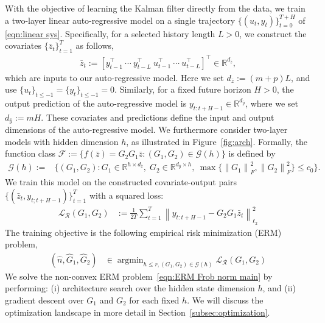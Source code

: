 \documentclass[11pt]{article}
\newcommand{\ybar}{\bar{y}}
\newcommand{\zbar}{\bar{z}}
\newcommand{\Fcal}{\mathcal{F}}
\newcommand{\Gcal}{\mathcal{G}}
\newcommand{\Lcal}{\mathcal{L}}
\newcommand{\Rcal}{\mathcal{R}}
\newcommand{\tn}[1]{\left\|{#1}\right\|_{\ell_2}}
\newcommand{\tf}[1]{\left\|{#1}\right\|_{F}}
\newcommand{\R}{\mathbb{R}}				%
\newcommand{\T}{\top}
\newcommand{\<}{\langle}
\renewcommand{\>}{\rangle}
\numberwithin{equation}{section}
\DeclareMathOperator*{\argmin}{argmin}
\begin{document}
With the objective of learning the Kalman filter directly from the data, we train a two-layer linear auto-regressive model on a single trajectory $\lbrace (u_t, y_t) \rbrace_{t=0}^{T+H}$ of \eqref{eqn:linear sys}. Specifically, for a selected history length $L>0$, we construct the covariates $\{\zbar_t\}_{t=1}^T$ as follows,
\begin{align}
    \zbar_t := [y_{t-1}^\T~\cdots~y_{t-L}^\T~u_{t-1}^\T~\cdots~u_{t-L}^\T]^\T \in \R^{d_{\zbar}}, \label{eqn:zbar_def}
\end{align}
which are inputs to our auto-regressive model. Here we set $d_{\zbar}:=(m+p)L$, and use $\{u_t\}_{t \leq -1} = \{y_t\}_{t \leq -1} = 0$. Similarly, for a fixed future horizon $H>0$, the output prediction of the auto-regressive model is $y_{t:t+H-1} \in \R^{d_{\ybar}}$, where we set $d_{\ybar} := mH$. 
These covariates and predictions define the input and output dimensions of the auto-regressive model. 
We furthermore consider two-layer models with hidden dimension $h$, as illustrated in Figure~\ref{fig:arch}.
Formally, the function class $\Fcal:=\{f(\zbar) = G_2G_1 \zbar : (G_1, G_2) \in \Gcal(h)\}$ is defined by
\begin{equation}
\begin{aligned} \label{eqn:function_class}
    \Gcal(h) := &\big\{(G_1, G_2) \colon G_1 \in \R^{h \times d_{\zbar}}, \; G_2 \in \R^{d_{\ybar} \times h}, ~\max\{\tf{G_1}^2, \tf{G_2}^2\} \leq c_0 \big\}.
\end{aligned}
\end{equation}
We train this model on the constructed covariate-output pairs $\lbrace (\zbar_t, y_{t;t+H-1}) \rbrace_{t=1}^{T}$ with a squared loss:
\begin{align}\label{eqn:loss}
    \Lcal_{\Rcal}(G_1,G_2) &:= \frac{1}{2T}\sum_{t=1}^{T}\tn{y_{t:t+H-1} - G_2 G_1 \zbar_t}^2 
\end{align}
The training objective is the following empirical risk minimization (ERM) problem, 
\begin{equation}
\begin{aligned} \label{eqn:ERM Frob norm main}
    (\hat{n}, \hat{G}_1, \hat{G}_2) & \in  \argmin_{h\leq r, (G_1,G_2) \in \Gcal(h)} \Lcal_{\Rcal}(G_1,G_2)
\end{aligned}
\end{equation}
We solve the non-convex ERM problem~\eqref{eqn:ERM Frob norm main} by performing: (i) architecture search over the hidden state dimension $h$, and (ii) gradient descent over $G_1$ and $G_2$ for each fixed $h$.
We will discuss the optimization landscape in more detail in Section~\ref{subsec:optimization}.
\end{document}
